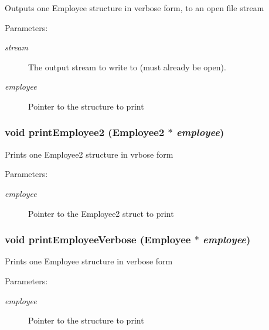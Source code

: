Outputs one Employee structure in verbose form, to an open file stream \begin{Desc}
\item[Parameters:]
\begin{description}
\item[{\em stream}]The output stream to write to (must already be open). \item[{\em employee}]Pointer to the structure to print \end{description}
\end{Desc}
\subsubsection{\setlength{\rightskip}{0pt plus 5cm}void print\-Employee2 (\bf{Employee2} $\ast$ {\em employee})}\label{etest_8h_fbc71af706444231a039d530cf076272}


Prints one Employee2 structure in vrbose form \begin{Desc}
\item[Parameters:]
\begin{description}
\item[{\em employee}]Pointer to the Employee2 struct to print \end{description}
\end{Desc}
\subsubsection{\setlength{\rightskip}{0pt plus 5cm}void print\-Employee\-Verbose (\bf{Employee} $\ast$ {\em employee})}\label{etest_8h_4d9da5be2623d2f7814ac0345dbe1733}


Prints one Employee structure in verbose form \begin{Desc}
\item[Parameters:]
\begin{description}
\item[{\em employee}]Pointer to the structure to print \end{description}
\end{Desc}
